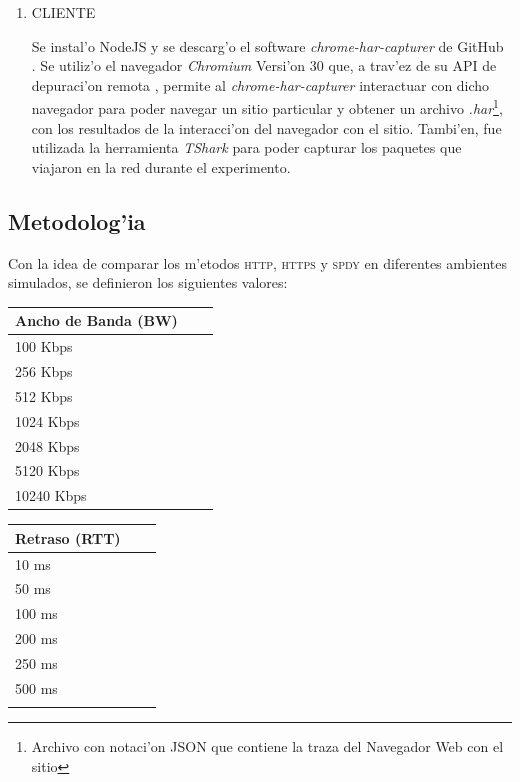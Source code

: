 \documentclass[a4paper,11pt,twocolumn]{article}
\begin{document}
\begin{enumerate}
\begin{quote}
gateway\_enable=''YES''
\end{quote}
Se configur'o el siguiente flag:
\begin{quote}\small
sysctl net.inet.ip.forwarding=1
\end{quote}
Y por 'ultimo, para que la Dummynet inicie junto con el Kernel del BSD se agreg'o la siguiente l'inea en el archivo \emph{''/bot/loader.conf''}
\begin{quote}\small
dummynet\_load=''YES''
\end{quote}
\item CLIENTE

Se instal'o NodeJS \cite{nodeJS} y se descarg'o el software \emph{chrome-har-capturer} \cite{harCapt} de GitHub \cite{github}.
Se utiliz'o el navegador \emph{Chromium} Versi'on 30 que, a trav'ez de su API de depuraci'on remota \cite{debuggingChrome}, permite al \emph{chrome-har-capturer} interactuar con dicho navegador para poder navegar un sitio particular y obtener un archivo \emph{.har}\footnote{Archivo con notaci'on JSON \cite{json} que contiene la traza del Navegador Web con el sitio}, con los resultados de la interacci'on del navegador con el sitio. Tambi'en, fue utilizada la herramienta \emph{TShark}\cite{tshark} para poder capturar los paquetes que viajaron en la red durante el experimento.

\end{enumerate} 

\subsection{Metodolog'ia}

Con la idea de comparar los m'etodos \textsc{http}, \textsc{https} y \textsc{spdy} en diferentes ambientes simulados, se definieron los siguientes valores:

\vspace*{1\baselineskip}
\begin{tabular}{ l c r }
	Ancho de Banda (BW)  \\ \hline
  	100 Kbps \\
	256 Kbps \\
	512 Kbps \\
	1024 Kbps \\
	2048 Kbps \\
	5120 Kbps \\
	10240 Kbps \\
\end{tabular}
\vspace*{1\baselineskip}
\begin{tabular}{ l c r }
	Retraso (RTT) \\ \hline
  	10 ms \\
	50 ms \\
	100 ms \\
	200 ms \\
	250 ms \\
	500 ms \\
	\\
\end{tabular}
\end{document}
